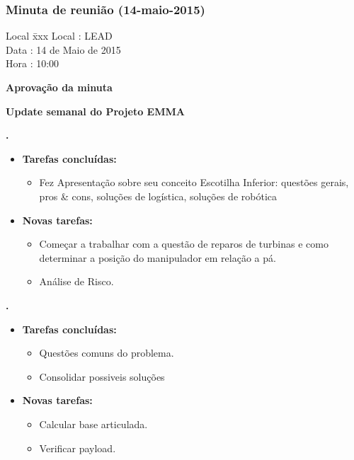 \subsubsection{Minuta de reunião (14-maio-2015)}

\begin{tabbing}
  Local \= xxx \kill
  Local \> : LEAD \\
  Data  \> : 14 de Maio de 2015 \\
  Hora  \> : 10:00
\end{tabbing}



\textbf{Aprovação da minuta}

\textbf{Update semanal do Projeto EMMA}
  
\textbf{\renan.} 
	\begin{itemize}
		\item \textbf{Tarefas concluídas:}
			\begin{itemize}    
				\item Fez Apresentação sobre seu conceito Escotilha
     Inferior: questões gerais, pros \& cons, soluções de logística, soluções de
     robótica
			\end{itemize}
		
		\item \textbf{Novas tarefas:}
			\begin{itemize} 
				\item Começar a trabalhar com a questão de reparos de
	turbinas e como determinar a posição do manipulador em relação a pá. 
				\item Análise de Risco.
			\end{itemize}
	\end{itemize}
	
\textbf{\elael.} 
    \begin{itemize}    
		\item \textbf{Tarefas concluídas:}
			\begin{itemize}
				\item Questões comuns do problema.
				\item Consolidar possiveis soluções 
			\end{itemize}
			
		\item \textbf{Novas tarefas:}
			\begin{itemize} 
				\item Calcular base articulada.
				\item Verificar payload.			
			\end{itemize}
	\end{itemize}
	
